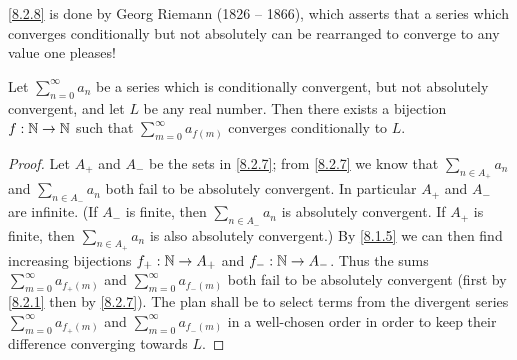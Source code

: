 \begin{note}
  \cref{8.2.8} is done by Georg Riemann (1826 -- 1866), which asserts that a series which converges conditionally but not absolutely can be rearranged to converge to any value one pleases!
\end{note}

\begin{thm}\label{8.2.8}
  Let \(\sum_{n = 0}^\infty a_n\) be a series which is conditionally convergent, but not absolutely convergent, and let \(L\) be any real number.
  Then there exists a bijection \(f : \mathbb{N} \to \mathbb{N}\) such that \(\sum_{m = 0}^\infty a_{f(m)}\) converges conditionally to \(L\).
\end{thm}

\begin{proof}
  Let \(A_+\) and \(A_-\) be the sets in \cref{8.2.7};
  from \cref{8.2.7} we know that \(\sum_{n \in A_+} a_n\) and \(\sum_{n \in A_-} a_n\) both fail to be absolutely convergent.
  In particular \(A_+\) and \(A_-\) are infinite.
  (If \(A_-\) is finite, then \(\sum_{n \in A_-} a_n\) is absolutely convergent.
  If \(A_+\) is finite, then \(\sum_{n \in A_+} a_n\) is also absolutely convergent.)
  By \cref{8.1.5} we can then find increasing bijections \(f_+ : \mathbb{N} \to A_+\) and \(f_- : \mathbb{N} \to A_-\).
  Thus the sums \(\sum_{m = 0}^\infty a_{f_+(m)}\) and \(\sum_{m = 0}^\infty a_{f_-(m)}\) both fail to be absolutely convergent (first by \cref{8.2.1} then by \cref{8.2.7}).
  The plan shall be to select terms from the divergent series \(\sum_{m = 0}^\infty a_{f_+(m)}\) and \(\sum_{m = 0}^\infty a_{f_-(m)}\) in a well-chosen order in order to keep their difference converging towards \(L\).


\end{proof}
